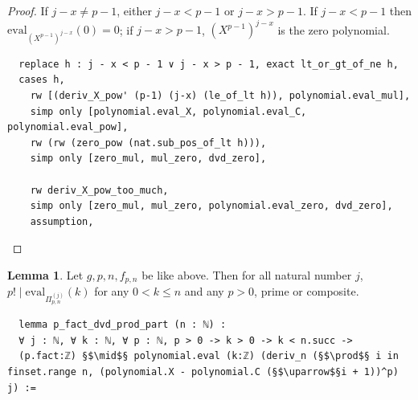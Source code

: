 \documentclass{report}
\theoremstyle{definition}
\newtheorem{lemma}{Lemma}[section]
\begin{document}
\begin{proof}
If $j-x\ne p-1$, either $j-x<p-1$ or $j-x > p-1$. If $j-x<p-1$ then $\mathrm{eval}_{(X^{p-1})^{j-x}}(0)=0$; if $j-x>p-1$, $(X^{p-1})^{j-x}$ is the zero polynomial.

\begin{verbatim}
  replace h : j - x < p - 1 ∨ j - x > p - 1, exact lt_or_gt_of_ne h,
  cases h,
    rw [(deriv_X_pow' (p-1) (j-x) (le_of_lt h)), polynomial.eval_mul], 
    simp only [polynomial.eval_X, polynomial.eval_C, polynomial.eval_pow], 
    rw (rw (zero_pow (nat.sub_pos_of_lt h))),
    simp only [zero_mul, mul_zero, dvd_zero],

    rw deriv_X_pow_too_much,
    simp only [zero_mul, mul_zero, polynomial.eval_zero, dvd_zero], 
    assumption,
\end{verbatim}
\end{proof}

\begin{lemma}\label{e:lemma_prod_part}
Let $g,p,n,f_{p,n}$ be like above. Then for all natural number $j$, $p!\mid\mathrm{eval}_{\Pi_{p,n}^{(j)}}(k)$ for any $0<k\le n$ and any $p>0$, prime or composite.

\begin{verbatim}
  lemma p_fact_dvd_prod_part (n : ℕ) : 
  ∀ j : ℕ, ∀ k : ℕ, ∀ p : ℕ, p > 0 -> k > 0 -> k < n.succ ->
  (p.fact:ℤ) §$\mid$§ polynomial.eval (k:ℤ) (deriv_n (§$\prod$§ i in finset.range n, (polynomial.X - polynomial.C (§$\uparrow$§i + 1))^p) j) :=
\end{verbatim}
\end{lemma}
\end{document}
